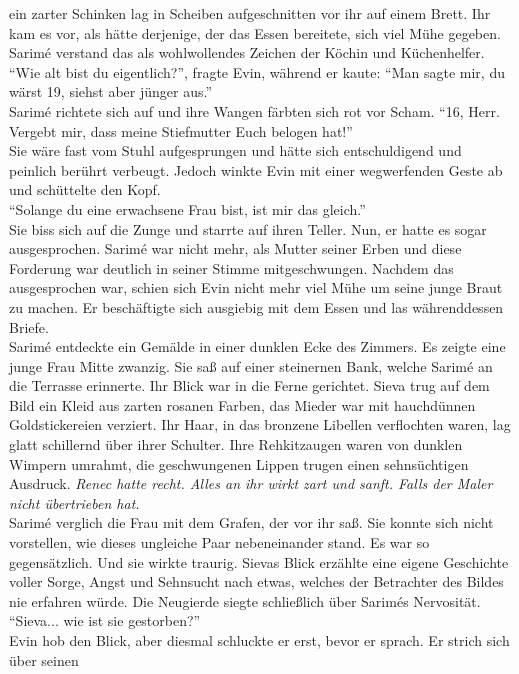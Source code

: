 ein zarter Schinken lag in Scheiben aufgeschnitten vor ihr auf einem Brett. Ihr kam es vor, als 
hätte derjenige, der das Essen bereitete, sich viel Mühe gegeben. Sarimé verstand das als 
wohlwollendes Zeichen der Köchin und Küchenhelfer.\\
``Wie alt bist du eigentlich?'', fragte Evin, während er kaute: ``Man sagte mir, du wärst 19, 
siehst aber jünger aus.''\\
Sarimé richtete sich auf und ihre Wangen färbten sich rot vor Scham. ``16, Herr. Vergebt mir, dass 
meine Stiefmutter Euch belogen hat!''\\
Sie wäre fast vom Stuhl aufgesprungen und hätte sich entschuldigend und peinlich berührt verbeugt. 
Jedoch winkte Evin mit einer wegwerfenden Geste ab und schüttelte den Kopf.\\
``Solange du eine erwachsene Frau bist, ist mir das gleich.''\\
Sie biss sich auf die Zunge und starrte auf ihren Teller. Nun, er hatte es sogar ausgesprochen. 
Sarimé war nicht mehr, als Mutter seiner Erben und diese Forderung war deutlich in seiner Stimme 
mitgeschwungen. Nachdem das ausgesprochen war, schien sich Evin nicht mehr viel Mühe um seine junge 
Braut zu machen. Er beschäftigte sich ausgiebig mit dem Essen und las währenddessen Briefe.\\
Sarimé entdeckte ein Gemälde in einer dunklen Ecke des Zimmers. Es zeigte eine junge Frau Mitte 
zwanzig. Sie saß auf einer steinernen Bank, welche Sarimé an die Terrasse erinnerte. Ihr Blick war 
in die Ferne gerichtet. Sieva trug auf dem Bild ein Kleid aus zarten rosanen Farben, das Mieder war 
mit hauchdünnen Goldstickereien verziert. Ihr Haar, in das bronzene Libellen verflochten waren, lag 
glatt schillernd über ihrer Schulter. Ihre Rehkitzaugen waren von dunklen Wimpern umrahmt, die 
geschwungenen Lippen trugen einen sehnsüchtigen Ausdruck. \textit{Renec hatte recht. Alles an ihr 
wirkt zart und sanft. Falls der Maler nicht übertrieben hat.}\\
Sarimé verglich die Frau mit dem Grafen, der vor ihr saß. Sie konnte sich nicht vorstellen, wie 
dieses ungleiche Paar nebeneinander stand. Es war so gegensätzlich. Und sie wirkte traurig. Sievas 
Blick erzählte eine eigene Geschichte voller Sorge, Angst und Sehnsucht nach etwas, welches der 
Betrachter des Bildes nie erfahren würde. Die Neugierde siegte schließlich über Sarimés Nervosität. 
``Sieva... wie ist sie gestorben?''\\
Evin hob den Blick, aber diesmal schluckte er erst, bevor er sprach. Er strich sich über seinen 
